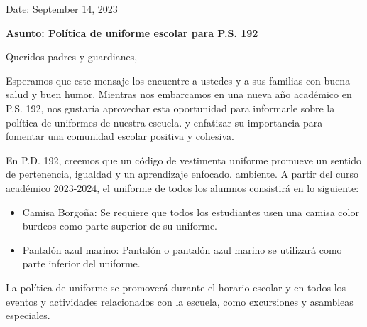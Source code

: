 \documentclass[12pt,letterpaper]{article}
\begin{document}
\vspace*{0.5in}
Date: \href{https://www.ps192.org/apps/bbmessages/show_bbm.jsp?REC_ID=139439}{September 14, 2023} 

\textbf{Asunto: Política de uniforme escolar para P.S. 192}

Queridos padres y guardianes,

Esperamos que este mensaje los encuentre a ustedes y a sus familias con buena salud y buen humor. Mientras nos embarcamos en una nueva
año académico en P.S. 192, nos gustaría aprovechar esta oportunidad para informarle sobre la política de uniformes de nuestra escuela.
y enfatizar su importancia para fomentar una comunidad escolar positiva y cohesiva.

En P.D. 192, creemos que un código de vestimenta uniforme promueve un sentido de pertenencia, igualdad y un aprendizaje enfocado.
ambiente. A partir del curso académico 2023-2024, el uniforme de todos los alumnos consistirá en lo siguiente:
\begin{itemize}
	\item Camisa Borgoña: Se requiere que todos los estudiantes usen una camisa color burdeos como parte superior de
su uniforme.
	\item Pantalón azul marino: Pantalón o pantalón azul marino se utilizará como parte inferior del uniforme.
\end{itemize}
La política de uniforme se promoverá durante el horario escolar y en todos los eventos y actividades relacionados con la escuela, como
excursiones y asambleas especiales.
\end{document}
